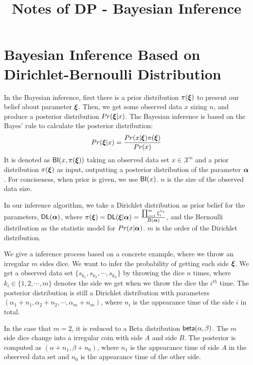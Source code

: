 

\title{\textbf{Notes of DP - Bayesian Inference}\\}
\date{\vspace{-10ex}}


\maketitle

\section{Bayesian Inference Based on Dirichlet-Bernoulli Distribution}
\label{sec_bayesInfer}
In the Bayesian inference, first there is a prior distribution $\pi(\boldsymbol{\xi})$ to present our belief about parameter $\boldsymbol{\xi}$. Then, we get some observed data $x$ sizing $n$, and produce a posterior distribution $Pr(\boldsymbol{\xi} | x)$. The Bayesian inference is based on the Bayes' rule to calculate the posterior distribution:
\begin{equation*}
Pr(\boldsymbol{\xi} | x) = \frac{Pr(x | \boldsymbol{\xi}) \pi(\boldsymbol{\xi})}{Pr(x)}
\end{equation*}
It is denoted as $\mathsf{BI}(x,\pi(\boldsymbol{\xi}))$ taking an observed data set $x \in \mathcal{X}^n$ and a prior distribution $\pi(\boldsymbol{\xi})$ as input, outputting a posterior distribution of the parameter $\boldsymbol{\alpha}$. For conciseness, when prior is given, we use $\mathsf{BI}(x)$. $n$ is the size of the observed data size.

In our inference algorithm, we take a Dirichlet distribution as prior belief for the parameters, $\mathsf{DL}(\boldsymbol{\alpha})$, where $\pi(\boldsymbol{\xi}) = \mathsf{DL}(\boldsymbol{\xi} | \boldsymbol{\alpha}) = \frac{\prod_{i = 1}^{m}\xi_i^{\alpha_i}}{B(\boldsymbol{\alpha})}$, and the Bernoulli distribution as the statistic model for $Pr(x | \boldsymbol{\alpha})$. $m$ is the order of the Dirichlet distribution.

We give a inference process based on a concrete example, where we throw an irregular $m$ sides dice. We want to infer the probability of getting each side $\boldsymbol{\xi}$. We get a observed data set $\{s_{k_1}, s_{k_2}, \cdots, s_{k_n}\}$ by throwing the dice $n$ times, where $k_i \in \{1,2,\cdots, m\}$ denotes the side we get when we throw the dice the $i^{th}$ time. The posterior distribution is still a Dirichlet distribution with parameters $(\alpha_1 + n_1, \alpha_2 + n_2, \cdots, \alpha_m + n_m)$, where $n_i$ is the appearance time of the side $i$ in total.

In the case that $m = 2$, it is reduced to a Beta distribution $\mathsf{beta}(\alpha, \beta)$. The $m$ side dice change into a irregular coin with side $A$ and side $B$. The posterior is computed as $(\alpha + n_1, \beta + n_0)$, where $n_1$ is the appearance time of side $A$ in the observed data set and $n_0$ is the appearance time of the other side.



